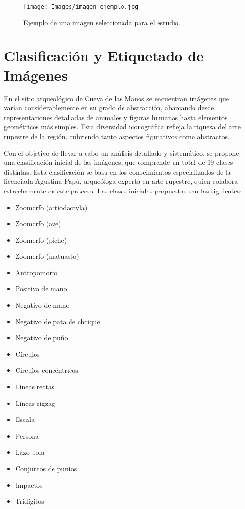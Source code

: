 \begin{figure}[ht!]
    \centering
    \texttt{[image: Images/imagen\_ejemplo.jpg]}
    \caption{Ejemplo de una imagen seleccionada para el estudio.}
    \label{fig:imagen_ejemplo}
\end{figure}

\section{Clasificación y Etiquetado de Imágenes}

En el sitio arqueológico de Cueva de las Manos se encuentran imágenes que varían considerablemente en su grado de abstracción, abarcando desde representaciones detalladas de animales y figuras humanas hasta elementos geométricos más simples.
Esta diversidad iconográfica refleja la riqueza del arte rupestre de la región, cubriendo tanto aspectos figurativos como abstractos.

Con el objetivo de llevar a cabo un análisis detallado y sistemático, se propone una clasificación inicial de las imágenes, que comprende un total de 19 clases distintas.
Esta clasificación se basa en los conocimientos especializados de la licenciada Agustina Papú, arqueóloga experta en arte rupestre, quien colabora estrechamente en este proceso.
Las clases iniciales propuestas son las siguientes:

\begin{itemize}
    \item Zoomorfo (artiodactyla)
    \item Zoomorfo (ave)
    \item Zoomorfo (piche)
    \item Zoomorfo (matuasto)
    \item Antropomorfo
    \item Positivo de mano
    \item Negativo de mano
    \item Negativo de pata de choique
    \item Negativo de puño
    \item Círculos
    \item Círculos concéntricos
    \item Líneas rectas
    \item Líneas zigzag
    \item Escala
    \item Persona
    \item Lazo bola
    \item Conjuntos de puntos
    \item Impactos
    \item Tridígitos
\end{itemize}

